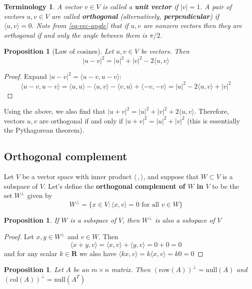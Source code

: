 \documentclass[12pt]{article}
\numberwithin{equation}{subsection}
\numberwithin{figure}{subsection}
\newtheorem{prop}[subsection]{Proposition}
\theoremstyle{note}
\newtheorem{terminology}[subsection]{Terminology}
\newcommand{\R}{\mathbf{R}}
\newcommand\nul[1]{\mathrm{null}(#1)}
\newcommand\col[1]{\mathrm{col}(#1)}
\newcommand\row[1]{\mathrm{row}(#1)}
\newcommand\ip[2]{\langle #1, #2\rangle}
\begin{document}
\begin{terminology}
	A vector $v\in V$ is called a \textbf{unit vector} if $|v|=1$. A pair of vectors $u,v\in V$ are called \textbf{orthogonal} (alternatively, \textbf{perpendicular}) if $\ip{u}{v}=0$. Note from \eqref{eq-vec-angle} that if $u,v$ are \textit{nonzero} vectors then they are orthogonal if and only the angle between them is $\pi/2$.
\end{terminology}

\begin{prop}[Law of cosines]
	Let $u,v\in V$ be vectors. Then \begin{equation} 
		|u-v|^2=|u|^2+|v|^2-2\ip{u}{v} 
	\end{equation}
\end{prop}
\begin{proof}
Expand $|u-v|^2=\ip{u-v}{u-v}$: \[ \ip{u-v}{u-v}=\ip{u}{u}-\ip{u}{v}-\ip{v}{u}+\ip{-v}{-v}=|u|^2 -2\ip{u}{v}+|v|^2\]


\end{proof}

Using the above, we also find that $|u+v|^2=|u|^2+|v|^2+2\ip{u}{v}$. Therefore, vectors $u,v$ are orthogonal if and only if $|u+v|^2=|u|^2+|v|^2$ (this is essentially the Pythagorean theorem). 


\subsection{Orthogonal complement} 

Let $V$ be a vector space with inner product $\ip{\,}{}$, and suppose that $W\subset V$ is a subspace of $V$. Let's define the \textbf{orthogonal complement of $W$ in $V$} to be the set $W^{\perp}$ given by \begin{equation} W^{\perp} =\{ x\in V : \ip{x}{v}=0 \text{ for all $v\in W$}\} \end{equation}
\begin{prop}
	 If $W$ is a subspace of $V$, then $W^{\perp}$ is also a subspace of $V$
\end{prop}
\begin{proof}
	Let $x,y\in W^{\perp}$ and $v\in W$. Then \[ \ip{x+y}{v}=\ip{x}{v}+\ip{y}{v}=0+0=0\] and for any scalar $k\in\R$ we also have $\ip{kx}{v}=k\ip{x}{v}=k0=0$
\end{proof}


\begin{prop}
	Let $A$ be an $m\times n$ matrix. Then $(\row A)^{\perp}=\nul A$ and $(\col A)^{\perp}=\nul{A^{T}}$
\end{prop}
\end{document}
